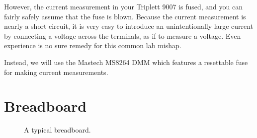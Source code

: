 However, the current measurement in your Triplett 9007 is fused, and
you can fairly safely assume that the fuse is blown.  Because the
current measurement is nearly a short circuit, it is very easy to
introduce an unintentionally large current by connecting a voltage
across the terminals, as if to measure a voltage.  Even experience is no
sure remedy for this common lab mishap.

Instead, we will use the Mastech MS8264 DMM which features a resettable
fuse for making current measurements.

\section{Breadboard}

\begin{figure}[htbp]
\begin{center}
\caption{A typical breadboard.}
\end{center}
\end{figure}

